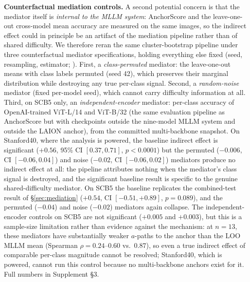 \documentclass[a4paper,fleqn]{cas-sc}
\begin{document}
\textbf{Counterfactual mediation controls.}
A second potential concern is that the mediator itself is \emph{internal to the MLLM system}: AnchorScore and the leave-one-out cross-model mean accuracy are measured on the same images, so the indirect effect could in principle be an artifact of the mediation pipeline rather than of shared difficulty. We therefore reran the same cluster-bootstrap pipeline under three counterfactual mediator specifications, holding everything else fixed (seed, resampling, estimator; ). First, a \emph{class-permuted} mediator: the leave-one-out means with class labels permuted (seed 42), which preserves their marginal distribution while destroying any true per-class signal. Second, a \emph{random-noise} mediator (fixed per-model seed), which cannot carry difficulty information at all. Third, on SCB5 only, an \emph{independent-encoder} mediator: per-class accuracy of OpenAI-trained ViT-L/14 and ViT-B/32 (the same evaluation pipeline as AnchorScore but with checkpoints outside the nine-model MLLM system and outside the LAION anchor), from the committed multi-backbone snapshot. On Stanford40, where the analysis is powered, the baseline indirect effect is significant ($+0.56$, 95\% CI $[0.37, 0.71]$, $p<0.0001$) but the permuted ($-0.006$, CI $[-0.06, 0.04]$) and noise ($-0.02$, CI $[-0.06, 0.02]$) mediators produce no indirect effect at all: the pipeline attributes nothing when the mediator's class signal is destroyed, and the significant baseline result is specific to the genuine shared-difficulty mediator. On SCB5 the baseline replicates the combined-test result of \S\ref{sec:mediation} ($+0.54$, CI $[-0.51, +0.89]$, $p=0.089$), and the permuted ($-0.04$) and noise ($-0.02$) mediators again collapse. The independent-encoder controls on SCB5 are not significant ($+0.005$ and $+0.003$), but this is a sample-size limitation rather than evidence against the mechanism: at $n=13$, these mediators have substantially weaker $a$-paths to the anchor than the LOO MLLM mean (Spearman $\rho=0.24$--$0.60$ vs.\ $0.87$), so even a true indirect effect of comparable per-class magnitude cannot be resolved; Stanford40, which is powered, cannot run this control because no multi-backbone anchors exist for it. Full numbers in Supplement \S3.
\end{document}
